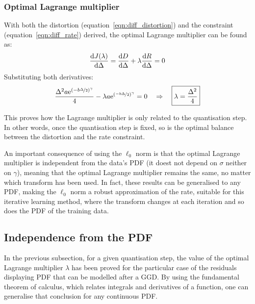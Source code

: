 \documentclass[11pt,a4paper,openright,twoside]{book}
\numberwithin{equation}{section} %
\begin{document}
\subsubsection{Optimal Lagrange multiplier}
\label{ssub:optimal_lagrange_multiplier}

With both the distortion (equation~\ref{eqn:diff_distortion}) and the
constraint (equation~\ref{eqn:diff_rate}) derived, the optimal Lagrange
multiplier can be found as:
\begin{equation}
	\frac{\text{d} J(\lambda)}{\text{d} \Delta}
	= \frac{\text{d} D}{\text{d} \Delta} +
	\lambda \frac{\text{d} R}{\text{d} \Delta} = 0 \\
	\label{eqn:diff_lagrange_multiplier}
\end{equation}
Substituting both derivatives:
\begin{equation}
	\frac{\Delta^2 a \text{e}^{{(-b\nicefrac{\Delta}{2})}^\gamma}}{4}
	- \lambda
	a\text{e}^{{\left(\nicefrac{-b\Delta}{2}\right)}^\gamma} = 0
	\quad \Rightarrow \quad \boxed{\lambda = \frac{\Delta^2}{4}}
\end{equation}

This proves how the Lagrange multiplier is only related to the
quantisation step.
In other words, once the quantisation step is fixed, so is the optimal
balance between the distortion and the rate constraint.

An important consequence of using the $\ell_0$ norm is that the optimal
Lagrange multiplier is independent from the data's \ac{PDF} (it doest
not depend on $\sigma$ neither on $\gamma$), meaning that the optimal
Lagrange multiplier remains the same, no matter which transform has been
used.
In fact, these results can be generalised to any \ac{PDF}, making the
$\ell_0$ norm a robust approximation of the rate, suitable for this
iterative learning method, where the transform changes at each iteration
and so does the \ac{PDF} of the training data.

\subsection{Independence from the \ac{PDF}}
\label{sub:independence_from_the_pdf}

In the previous subsection, for a given quantisation step, the value of
the optimal Lagrange multiplier $\lambda$ has been proved for the
particular case of the residuals displaying \ac{PDF} that can be
modelled after a \ac{GGD}.
By using the fundamental theorem of calculus, which relates integrals
and derivatives of a function, one can generalise that conclusion for
any continuous \ac{PDF}.
\end{document}

